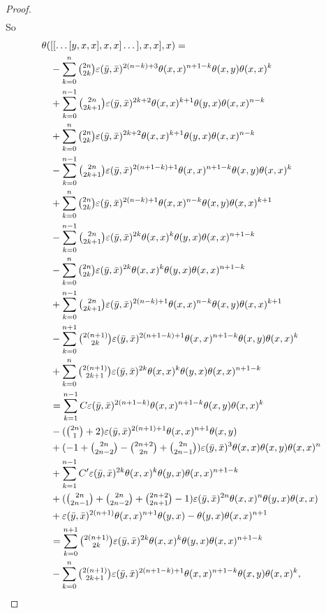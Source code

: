 \documentclass[11pt, twoside]{article}
\begin{document}
\begin{proof}
\begin{align*}
    \end{align*} So \begin{align*}
        \theta(&[[\dots[y,x,x],x,x]\dots],x,x],x) = \\ & -\sum\limits_{k=0}^n\tbinom{2n}{2k}\varepsilon(\bar{y},\bar{x})^{2(n-k)+3}\theta(x,x)^{n+1-k}\theta(x,y)\theta(x,x)^k  \\ &+ \sum\limits_{k=0}^{n-1}\tbinom{2n}{2k+1}\varepsilon(\bar{y},\bar{x})^{2k+2}\theta(x,x)^{k+1}\theta(y,x)\theta(x,x)^{n-k} \\ &+\sum\limits_{k=0}^n\tbinom{2n}{2k}\varepsilon(\bar{y},\bar{x})^{2k+2}\theta(x,x)^{k+1}\theta(y,x)\theta(x,x)^{n-k} \\ &  - \sum\limits_{k=0}^{n-1}\tbinom{2n}{2k+1}\varepsilon(\bar{y},\bar{x})^{2(n+1-k)+1}\theta(x,x)^{n+1-k}\theta(x,y)\theta(x,x)^k \\ & + \sum\limits_{k=0}^n\tbinom{2n}{2k}\varepsilon(\bar{y},\bar{x})^{2(n-k)+1}\theta(x,x)^{n-k}\theta(x,y)\theta(x,x)^{k+1}\\ & - \sum\limits_{k=0}^{n-1}\tbinom{2n}{2k+1}\varepsilon(\bar{y},\bar{x})^{2k}\theta(x,x)^k\theta(y,x)\theta(x,x)^{n+1-k} \\ & - \sum\limits_{k=0}^n\tbinom{2n}{2k}\varepsilon(\bar{y},\bar{x})^{2k}\theta(x,x)^k\theta(y,x)\theta(x,x)^{n+1-k}  \\ &+ \sum\limits_{k=0}^{n-1}\tbinom{2n}{2k+1}\varepsilon(\bar{y},\bar{x})^{2(n-k)+1}\theta(x,x)^{n-k}\theta(x,y)\theta(x,x)^{k+1} \\ & - \sum\limits_{k=0}^{n+1}\tbinom{2(n+1)}{2k}\varepsilon(\bar{y},\bar{x})^{2(n+1-k)+1}\theta(x,x)^{n+1-k}\theta(x,y)\theta(x,x)^k \\ &+ \sum\limits_{k=0}^{n}\tbinom{2(n+1)}{2k+1}\varepsilon(\bar{y},\bar{x})^{2k}\theta(x,x)^k\theta(y,x)\theta(x,x)^{n+1-k} \\ &= \sum\limits_{k=1}^{n-1}C\varepsilon(\bar{y},\bar{x})^{2(n+1-k)}\theta(x,x)^{n+1-k}\theta(x,y)\theta(x,x)^k \\ & -(\tbinom{2n}{1}+2)\varepsilon(\bar{y},\bar{x})^{2(n+1)+1}\theta(x,x)^{n+1}\theta(x,y) \\ &+(-1+\tbinom{2n}{2n-2} -\tbinom{2n+2}{2n}+\tbinom{2n}{2n-1}) \varepsilon(\bar{y},\bar{x})^3\theta(x,x)\theta(x,y)\theta(x,x)^n \\  &+ \sum\limits_{k=1}^{n-1}C'\varepsilon(\bar{y},\bar{x})^{2k}\theta(x,x)^k\theta(y,x)\theta(x,x)^{n+1-k} \\ & + (\tbinom{2n}{2n-1}+ \tbinom{2n}{2n-2} + \tbinom{2n+2}{2n+1}-1)\varepsilon(\bar{y},\bar{x})^{2n}\theta(x,x)^n\theta(y,x)\theta(x,x) \\ &+ \varepsilon(\bar{y},\bar{x})^{2(n+1)}\theta(x,x)^{n+1}\theta(y,x) - \theta(y,x)\theta(x,x)^{n+1} \\ & = \sum\limits_{k=0}^{n+1}\tbinom{2(n+1)}{2k}\varepsilon(\bar{y},\bar{x})^{2k}\theta(x,x)^k\theta(y,x)\theta(x,x)^{n+1-k} \\ &  - \sum\limits_{k=0}^{n}\tbinom{2(n+1)}{2k+1}\varepsilon(\bar{y},\bar{x})^{2(n+1-k)+1}\theta(x,x)^{n+1-k}\theta(x,y)\theta(x,x)^k, 

\end{align*}
\end{proof}
\end{document}
